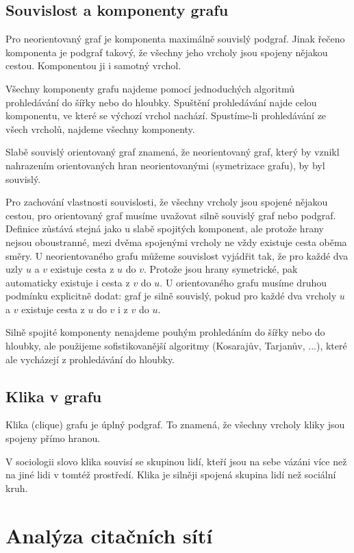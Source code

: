 \documentclass[12pt,titlepage]{report}
\begin{document}
\subsection{Souvislost a komponenty grafu}
Pro neorientovaný graf je komponenta maximálně souvislý podgraf. Jinak řečeno
komponenta je podgraf takový, že všechny jeho vrcholy jsou spojeny nějakou
cestou. Komponentou ji i samotný vrchol.

Všechny komponenty grafu najdeme pomocí jednoduchých algoritmů prohledávání do
šířky nebo do hloubky. Spuštění prohledávání najde celou komponentu, ve které
se výchozí vrchol nachází. Spustíme-li prohledávání ze všech vrcholů, najdeme
všechny komponenty. 

Slabě souvislý orientovaný graf znamená, že neorientovaný graf, který by vznikl
nahrazením orientovaných hran neorientovanými (symetrizace grafu), by byl
souvislý.

Pro zachování vlastnosti souvislosti, že všechny vrcholy jsou spojené nějakou
cestou, pro orientovaný graf musíme uvažovat silně souvislý graf nebo podgraf.
Definice zůstává stejná jako u slabě spojitých komponent, ale protože hrany
nejsou oboustranné, mezi dvěma spojenými vrcholy ne vždy existuje cesta oběma
směry. U neorientovaného grafu můžeme souvislost vyjádřit tak, že pro každé dva
uzly $u$ a $v$ existuje cesta z $u$ do $v$. Protože jsou hrany symetrické, pak
automaticky existuje i cesta z $v$ do $u$. U orientovaného grafu musíme druhou
podmínku explicitně dodat: graf je silně souvislý, pokud pro každé dva vrcholy
$u$ a $v$ existuje cesta z $u$ do $v$ i z $v$ do $u$. 

Silně spojité komponenty nenajdeme pouhým prohledáním do šířky nebo do hloubky,
ale použijeme sofistikovanější algoritmy (Kosarajův, Tarjanův, ...), které ale
vycházejí z prohledávání do hloubky.

\subsection{Klika v grafu}
Klika (clique) grafu je úplný podgraf. To znamená, že všechny vrcholy kliky
jsou spojeny přímo hranou.

V sociologii slovo klika souvisí se skupinou lidí, kteří jsou na sebe vázáni
více než na jiné lidi v tomtéž prostředí. Klika je silněji spojená skupina lidí
než sociální kruh.

\section{Analýza citačních sítí}
\end{document}
